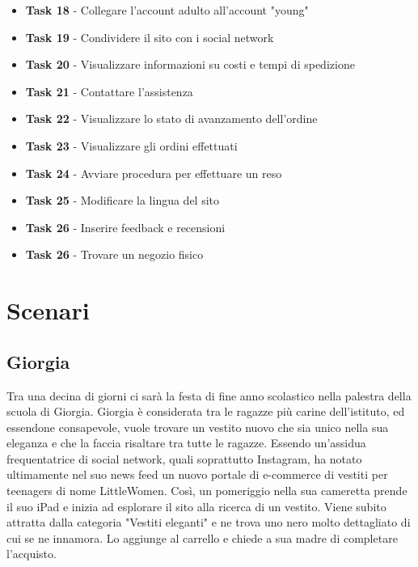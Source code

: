 \documentclass[12pt,a4paper]{report}
\begin{document}
\begin{itemize}
  \item \textbf{Task 18} - Collegare l'account adulto all'account "young"
  \item \textbf{Task 19} - Condividere il sito con i social network
  \item \textbf{Task 20} - Visualizzare informazioni su costi e tempi di spedizione
  \item \textbf{Task 21} - Contattare l'assistenza
  \item \textbf{Task 22} - Visualizzare lo stato di avanzamento dell'ordine
  \item \textbf{Task 23} - Visualizzare gli ordini effettuati
  \item \textbf{Task 24} - Avviare procedura per effettuare un reso
  \item \textbf{Task 25} - Modificare la lingua del sito
  \item \textbf{Task 26} - Inserire feedback e recensioni
  \item \textbf{Task 26} - Trovare un negozio fisico

\end{itemize}
\section{Scenari}
\subsection*{Giorgia}
Tra una decina di giorni ci sarà la festa di fine anno scolastico nella palestra della scuola di Giorgia. Giorgia è considerata tra le ragazze più carine dell'istituto, ed essendone consapevole, vuole trovare un vestito nuovo che sia unico nella sua eleganza e che la faccia risaltare tra tutte le ragazze. Essendo un'assidua frequentatrice di social network, quali soprattutto Instagram, ha notato ultimamente nel suo news feed un nuovo portale di e-commerce di vestiti per teenagers di nome LittleWomen. Così, un pomeriggio nella sua cameretta prende il suo iPad e inizia ad esplorare il sito alla ricerca di un vestito. Viene subito attratta dalla categoria "Vestiti eleganti" e ne trova uno nero molto dettagliato di cui se ne innamora. Lo aggiunge al carrello e chiede a sua madre di completare l'acquisto.
\end{document}
